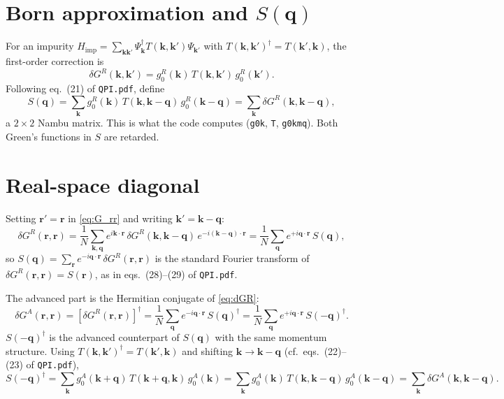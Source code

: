 \documentclass[11pt]{article}
\newcommand{\bk}{\mathbf{k}}
\newcommand{\bq}{\mathbf{q}}
\newcommand{\br}{\mathbf{r}}
\newcommand{\GR}{G^{R}}
\newcommand{\GA}{G^{A}}
\begin{document}
\section{Born approximation and $S(\bq)$}

For an impurity $H_{\mathrm{imp}} = \sum_{\bk\bk'} \Psi^{\dagger}_{\bk} T(\bk,\bk') \Psi_{\bk'}$ with $T(\bk,\bk')^{\dagger} = T(\bk',\bk)$, the first-order correction is
\begin{equation}
  \delta\GR(\bk,\bk') = g^R_0(\bk)\, T(\bk,\bk')\, g^R_0(\bk') .
\end{equation}
Following eq.~(21) of \texttt{QPI.pdf}, define
\begin{equation}
  S(\bq) = \sum_{\bk} g^R_0(\bk)\, T(\bk,\bk-\bq)\, g^R_0(\bk-\bq) = \sum_{\bk} \delta\GR(\bk,\bk-\bq),
  \label{eq:S}
\end{equation}
a $2\times2$ Nambu matrix. This is what the code computes (\texttt{g0k}, \texttt{T}, \texttt{g0kmq}). Both Green's functions in $S$ are retarded.

\section{Real-space diagonal}

Setting $\br' = \br$ in \eqref{eq:G_rr} and writing $\bk' = \bk - \bq$:
\begin{equation}
  \delta\GR(\br,\br) = \frac{1}{N}\sum_{\bk,\bq} e^{i\bk\cdot\br}\, \delta\GR(\bk,\bk-\bq)\, e^{-i(\bk-\bq)\cdot\br}
  = \frac{1}{N}\sum_{\bq} e^{+i\bq\cdot\br}\, S(\bq),
  \label{eq:dGR}
\end{equation}
so $S(\bq) = \sum_{\br} e^{-i\bq\cdot\br}\,\delta\GR(\br,\br)$ is the standard Fourier transform of $\delta\GR(\br,\br) = S(\br)$, as in eqs.~(28)--(29) of \texttt{QPI.pdf}.

The advanced part is the Hermitian conjugate of \eqref{eq:dGR}:
\begin{equation}
  \delta\GA(\br,\br) = \left[\delta\GR(\br,\br)\right]^{\dagger}
  = \frac{1}{N}\sum_{\bq} e^{-i\bq\cdot\br}\, S(\bq)^{\dagger}
  = \frac{1}{N}\sum_{\bq} e^{+i\bq\cdot\br}\, S(-\bq)^{\dagger}.
  \label{eq:dGA}
\end{equation}
$S(-\bq)^{\dagger}$ is the advanced counterpart of $S(\bq)$ with the same momentum structure. Using $T(\bk,\bk')^{\dagger} = T(\bk',\bk)$ and shifting $\bk \to \bk-\bq$ (cf.\ eqs.~(22)--(23) of \texttt{QPI.pdf}),
\begin{equation}
  S(-\bq)^{\dagger} = \sum_{\bk} g^A_0(\bk+\bq)\, T(\bk+\bq,\bk)\, g^A_0(\bk)
  = \sum_{\bk} g^A_0(\bk)\, T(\bk,\bk-\bq)\, g^A_0(\bk-\bq)
  = \sum_{\bk} \delta\GA(\bk,\bk-\bq).
\end{equation}
\end{document}
